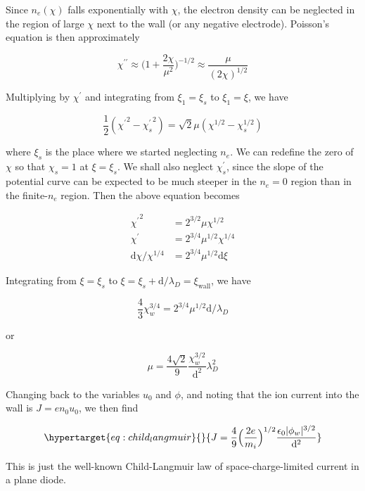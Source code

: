 \documentclass[
  notoc %
]{tufte-book}
\begin{document}
Since \(n_e(\chi)\) falls exponentially with \(\chi\), the electron
density can be neglected in the region of large \(\chi\) next to the
wall (or any negative electrode). Poisson's equation is then
approximately

\[
\chi^{\prime\prime} \approx \Big( 1+\frac{2\chi}{\mu^2} \Big)^{-1/2} \approx \frac{\mu}{(2\chi)^{1/2}}
\]

Multiplying by \(\chi^\prime\) and integrating from \(\xi_1=\xi_s\) to
\(\xi_1=\xi\), we have

\[
\frac{1}{2}({\chi^\prime}^2 - {\chi_s^\prime}^2) = \sqrt{2}\mu(\chi^{1/2} - \chi_s^{1/2})
\]

where \(\xi_s\) is the place where we started neglecting \(n_e\). We can
redefine the zero of \(\chi\) so that \(\chi_s=1\) at \(\xi=\xi_s\). We
shall also neglect \(\chi_s^\prime\), since the slope of the potential
curve can be expected to be much steeper in the \(n_e=0\) region than in
the finite-\(n_e\) region. Then the above equation becomes

\[
\begin{aligned}
{\chi^\prime}^2 &= 2^{3/2}\mu\chi^{1/2} \\
\chi^\prime &= 2^{3/4}\mu^{1/2}\chi^{1/4} \\
\mathrm{d}\chi/\chi^{1/4} &= 2^{3/4}\mu^{1/2} \mathrm{d}\xi
\end{aligned}
\]

Integrating from \(\xi=\xi_s\) to
\(\xi=\xi_s+\mathrm{d}/\lambda_D = \xi_{\text{wall}}\), we have

\[
\frac{4}{3}\chi_w^{3/4} = 2^{3/4}\mu^{1/2}\mathrm{d}/\lambda_D
\]

or

\[
\mu = \frac{4\sqrt{2}}{9}\frac{\chi_w^{3/2}}{\mathrm{d}^2}\lambda_D^2
\]

Changing back to the variables \(u_0\) and \(\phi\), and noting that the
ion current into the wall is \(J=en_0u_0\), we then find

\begin{equation}\protect\hypertarget{eq:child_langmuir}{}{
J = \frac{4}{9}\Big( \frac{2e}{m_i} \Big)^{1/2} \frac{\epsilon_0|\phi_w|^{3/2}}{\mathrm{d}^2}
}\label{eq:child_langmuir}\end{equation}

This is just the well-known Child-Langmuir law of space-charge-limited
current in a plane diode.
\end{document}
